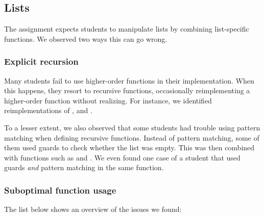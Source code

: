 \subsection{Lists}

The assignment expects students to manipulate lists by combining list-specific functions. We observed two ways this can go wrong.

\subsubsection{Explicit recursion}

Many students fail to use higher-order functions in their implementation. When this happens, they resort to recursive functions, occasionally reimplementing a higher-order function without realizing. For instance, we identified reimplementations of ,  and .

To a lesser extent, we also observed that some students had trouble using pattern matching when defining recursive functions. Instead of pattern matching, some of them used guards to check whether the list was empty. This was then combined with functions such as  and . We even found one case of a student that used guards \emph{and} pattern matching in the same function.


\subsubsection{Suboptimal function usage}

The list below shows an overview of the issues we found:

